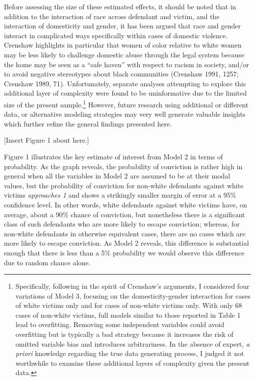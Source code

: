 \documentclass[12pt,article]{article}
\begin{document}
Before assessing the size of these estimated effects, it should be noted
that in addition to the interaction of race across defendant and victim,
and the interaction of domesticity and gender, it has been argued that
race and gender interact in complicated ways specifically within cases
of domestic violence. Crenshaw highlights in particular that women of
color relative to white women may be less likely to challenge domestic
abuse through the legal system because the home may be seen as a ``safe
haven'' with respect to racism in society, and/or to avoid negative
stereotypes about black communities (Crenshaw 1991, 1257; Crenshaw 1989,
71). Unfortunately, separate analyses attempting to explore this
additional layer of complexity were found to be uninformative due to the
limited size of the present sample.\footnote{Specifically, following in
  the spirit of Crenshaw's arguments, I considered four variations of
  Model 3, focusing on the domesticity-gender interaction for cases of
  white victims only and for cases of non-white victims only. With only
  68 cases of non-white victims, full models similar to those reported
  in Table 1 lead to overfitting. Removing some independent variables
  could avoid overfitting but is typically a bad strategy because it
  increases the risk of omitted variable bias and introduces
  arbitrariness. In the absence of expert, \emph{a priori} knowledge
  regarding the true data generating process, I judged it not worthwhile
  to examine these additional layers of complexity given the present
  data.} However, future research using additional or different data, or
alternative modeling strategies may very well generate valuable insights
which further refine the general findings presented here.

\pagebreak

\begin{center}[Insert Figure 1 about here.]\end{center}

Figure 1 illustrates the key estimate of interest from Model 2 in terms
of probability. As the graph reveals, the probability of conviction is
rather high in general when all the variables in Model 2 are assumed to
be at their modal values, but the probability of conviction for
non-white defendants against white victims \emph{approaches 1} and shows
a strikingly smaller margin of error at a 95\% confidence level. In
other words, white defendants against white victims have, on average,
about a 90\% chance of conviction, but nonetheless there is a
significant class of such defendants who are more likely to escape
conviction; whereas, for non-white defendants in otherwise equivalent
cases, there are no cases which are more likely to escape conviction. As
Model 2 reveals, this difference is substantial enough that there is
less than a 5\% probability we would observe this difference due to
random chance alone.
\end{document}
